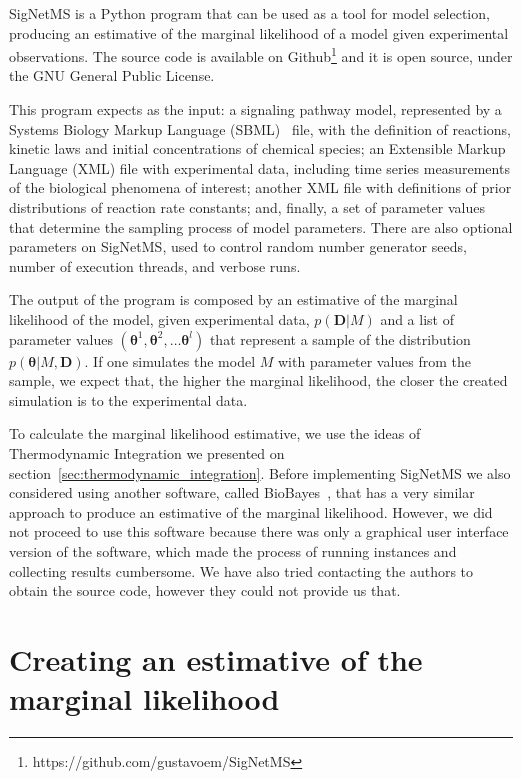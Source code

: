 SigNetMS is a Python program that can be used as a tool for model
selection, producing an estimative of the marginal likelihood of a model
given experimental observations. The source code is available on 
Github\footnote{https://github.com/gustavoem/SigNetMS} and it is open
source, under the GNU General Public License.

This program expects as the input: a signaling pathway model,
represented by a Systems Biology Markup Language
(SBML)~\cite{hucka2003systems} file, with the definition of reactions,
kinetic laws and initial concentrations of chemical species; an
Extensible Markup Language (XML) file with experimental data, including 
time series measurements of the  biological phenomena of interest;
another XML file with definitions of prior distributions of reaction
rate constants; and, finally, a set of parameter values that determine
the sampling process of model parameters. There are also optional
parameters on SigNetMS, used to control random number generator seeds,
number of execution threads, and verbose runs.

The output of the program is composed by an estimative of the marginal
likelihood of the model, given experimental data, $p({\bm D} | M)$ and a
list of parameter values $({\bm \theta}^1, {\bm \theta}^2, \ldots {\bm
\theta}^l)$ that represent a sample of the distribution $p({\bm \theta}
| M, {\bm D})$. If one simulates the model $M$ with parameter values
from the sample, we expect that, the higher the marginal likelihood, the
closer the created simulation is to the experimental data.

To calculate the marginal likelihood estimative, we use the ideas of 
Thermodynamic Integration we presented on 
section~\ref{sec:thermodynamic_integration}. Before implementing
SigNetMS we also considered using another software, called
BioBayes~\cite{Vyshemirsky2008}, that has a very similar approach to
produce an estimative of the marginal likelihood. However, we did not
proceed to use this software because there was only a graphical user
interface version of the software, which made the process of running
instances and collecting results cumbersome. We have also tried
contacting the authors to obtain the source code, however they could not
provide us that.

\section{Creating an estimative of the marginal likelihood}
\label{sec:creating_an_estimative_of_the_marginal_likelihood}

